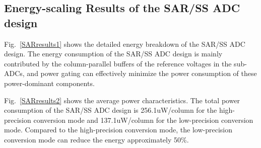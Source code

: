 \subsection{Energy-scaling Results of the SAR/SS ADC design}\label{SAR power}

Fig.~\ref{SARresults1} shows the detailed energy breakdown of the SAR/SS ADC design.
The energy consumption of the SAR/SS ADC design is mainly contributed by the column-parallel 
buffers of the reference voltages in the sub-ADCs, and power gating can effectively minimize 
the power consumption of these power-dominant components. 

Fig.~\ref{SARresults2} shows the average power characteristics. The total power consumption of 
the SAR/SS ADC design is 256.1uW/column for the high-precision conversion mode and 137.1uW/column 
for the low-precision conversion mode. Compared to the high-precision conversion mode, the low-precision 
conversion mode can reduce the energy approximately 50\%.

